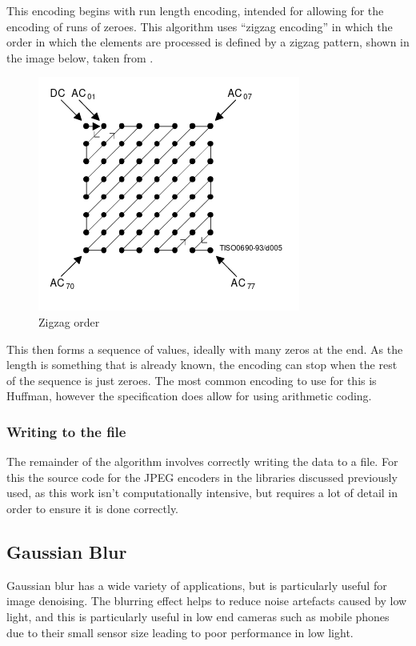 \documentclass[12pt,a4paper]{article}
\begin{document}
This encoding begins with run length encoding, intended for allowing for the encoding of runs of zeroes. This algorithm uses “zigzag encoding” in which the order in which the elements are processed is defined by a zigzag pattern, shown in the image below, taken from \cite{jpeg}.

\begin{figure}[H]
    \centering
    \includegraphics{zigzag.png}
    \caption{Zigzag order}
\end{figure}

This then forms a sequence of values, ideally with many zeros at the end. As the length is something that is already known, the encoding can stop when the rest of the sequence is just zeroes. The most common encoding to use for this is Huffman, however the specification does allow for using arithmetic coding.

\subsubsection{Writing to the file}

The remainder of the algorithm involves correctly writing the data to a file. For this the source code for the JPEG encoders in the libraries discussed previously used, as this work isn't computationally intensive, but requires a lot of detail in order to ensure it is done correctly.

\subsection{Gaussian Blur}

Gaussian blur has a wide variety of applications, but is particularly useful for image denoising. The blurring effect helps to reduce noise artefacts caused by low light, and this is particularly useful in low end cameras such as mobile phones due to their small sensor size leading to poor performance in low light.
\end{document}
